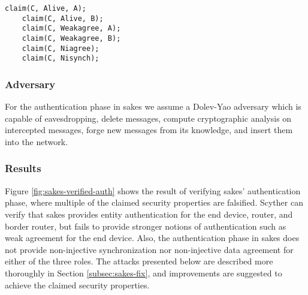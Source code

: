\begin{lstlisting}[caption={Security claims for role C during key establishment in SAKES.}, label={lst:claims-c-sakes-auth}]
	claim(C, Alive, A);
	claim(C, Alive, B);
	claim(C, Weakagree, A);
	claim(C, Weakagree, B);
	claim(C, Niagree);
	claim(C, Nisynch);
\end{lstlisting}

\subsubsection{Adversary}

For the authentication phase in \gls{sakes} we assume a Dolev-Yao adversary which is capable of eavesdropping, delete messages, compute cryptographic analysis on intercepted messages, forge new messages from its knowledge, and insert them into the network. 

\subsubsection{Results}

Figure \ref{fig:sakes-verified-auth} shows the result of verifying \gls{sakes}' authentication phase, where multiple of the claimed security properties are falsified. Scyther can verify that \gls{sakes} provides entity authentication for the end device, router, and border router, but fails to provide stronger notions of authentication such as weak agreement for the end device. Also, the authentication phase in \gls{sakes} does not provide non-injective synchronization nor non-injective data agreement for either of the three roles. The attacks presented below are described more thoroughly in Section \ref{subsec:sakes-fix}, and improvements are suggested to achieve the claimed security properties.

